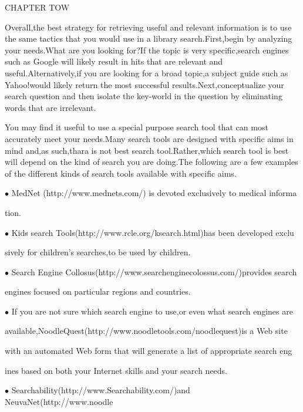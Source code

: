 \documentclass[10pt,a4paper]{book}
\begin{document}
\begin{flushleft}
  \textbf{\!\!\!\!\!\!\!\!\!\!\!\!\!\!\!\!\!\!\!} \qquad CHAPTER TOW
\end{flushleft}

Overall,the best strategy for retrieving useful and relevant information is to use the same tactics that you would use in a library search.First,begin by analyzing your needs.What are you looking for?If the topic is very specific,search engines such as Google will likely result in hits that are relevant and useful.Alternatively,if you are looking for a broad topic,a subject guide such as Yahoo!would likely return the most successful results.Next,conceptualize your search question and then isolate the key-world in the question by eliminating words that are irrelevant.

You may find it useful to use a special purpose search tool that can most accurately meet your needs.Many search tools are designed with specific aims in mind and,as such,thara is not best search tool.Rather,which search tool is best will depend on the kind of search you are doing.The following are a few examples of the different kinds of search tools available with specific aims.

\qquad

\small

$\bullet$ MedNet (http://www.mednets.com/) is devoted exclusively to medical informa

\quad tion.

$\bullet$ Kids search Tools(http://www.rcle.org/ksearch.html)has been developed exclu

\quad  sively for children's searches,to be used by children.


$\bullet$ Search Engine Collosus(http://www.searchenginecolossus.com/)provides search

\quad  engines focused on particular regions and countries.


$\bullet$ If you are not sure which search engine to use,or even what search engines are 

\quad  available,NoodleQuest(http://www.noodletools.com/noodlequest)is a Web site

\quad  with an automated Web form that will generate a list of appropriate search eng

\quad  ines based on both your Internet skills and your search needs.

$\bullet$ Searchability(http://www.Searchability.com/)and NeuvaNet(http://www.noodle
\end{document}
